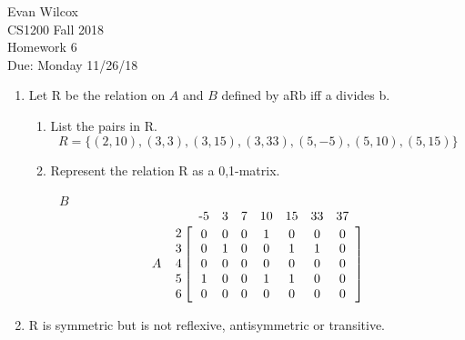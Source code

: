 \documentclass{article}
\newcommand{\indsize}{}
\newcommand{\colind}[2]{\displaystyle\smash{\mathop{#1}^{\raisebox{.5\normalbaselineskip}{\indsize #2}}}}
\newcommand{\rowind}[1]{\mbox{\indsize #1}}
\begin{document}
        

\begin{flushleft}
    Evan Wilcox\\
    CS1200 Fall 2018\\
    Homework 6\\
    Due: Monday 11/26/18
\end{flushleft}
        
\begin{enumerate}

    \item Let R be the relation on $A$ and $B$ defined by aRb iff a divides b.

    \begin{enumerate}
        \item List the pairs in R.
        $$R=\{(2, 10), (3, 3), (3, 15), (3, 33), (5, -5), (5, 10), (5, 15)\}$$

        \item Represent the relation R as a 0,1-matrix.
        
        \begin{center}
            $\:\:\:B$
        \end{center}
        \[
            A \: \: \: \: \:
          \begin{array}{@{}c@{}}
            \rowind{2} \\ \rowind{3} \\ \rowind{4} \\ \rowind{5} \\ \rowind{6}
          \end{array}
          \mathop{\left[
          \begin{array}{ *{7}{c} }
             \colind{0}{-5}  &  \colind{0}{3}  &  \colind{0}{7}  & \colind{1}{10} & \colind{0}{15}  & \colind{0}{33} & \colind{0}{37}\\
             0 & 1 & 0 & 0 & 1 & 1 & 0 \\
             0 & 0 & 0 & 0 & 0 & 0 & 0 \\
             1 & 0 & 0 & 1 & 1 & 0 & 0 \\
             0 & 0 & 0 & 0 & 0 & 0 & 0
          \end{array}
          \right]}^{
          }
        \]
        
    \end{enumerate}
    \item R is symmetric but is not reflexive, antisymmetric or transitive.
    

\end{enumerate}
\end{document}
